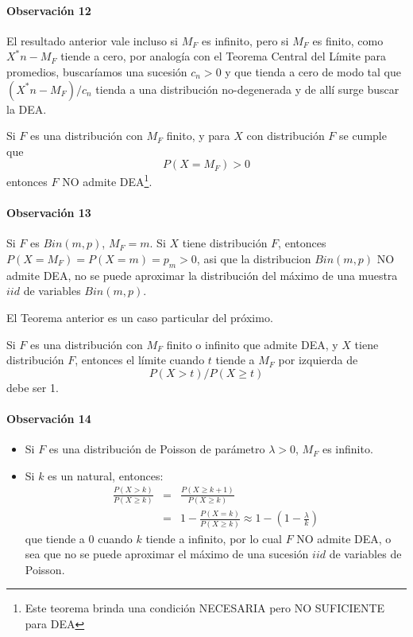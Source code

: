 \documentclass[
  12pt]{article}
\begin{document}
\paragraph*{Observación 12}

El resultado anterior vale incluso si \(M_F\) es infinito, pero si
\(M_F\) es finito, como \(X^*n - M_F\) tiende a cero, por analogía con
el Teorema Central del Límite para promedios, buscaríamos una sucesión
\(c_n>0\) y que tienda a cero de modo tal que \((X^*n- M_F )/ c_n\)
tienda a una distribución no-degenerada y de allí surge buscar la DEA.

\begin{theorem}
Si $F$ es una distribución con $M_F$ finito, y para $X$ con distribución $F$ se cumple que
$$
P(X=M_F)>0 
$$
entonces $F$ NO admite DEA\footnote{Este teorema brinda una condición NECESARIA pero NO SUFICIENTE para DEA}.
\end{theorem}

\paragraph*{Observación 13}

Si \(F\) es \(Bin(m,p)\), \(M_F=m\). Si \(X\) tiene distribución \(F\),
entonces \(P( X=M_F)= P( X=m)= p_m>0\), asi que la distribucion
\(Bin(m,p)\) NO admite DEA, no se puede aproximar la distribución del
máximo de una muestra \(iid\) de variables \(Bin(m,p)\).

El Teorema anterior es un caso particular del próximo.

\begin{theorem}
Si $F$ es una distribución con $M_F$ finito o infinito que admite DEA, y $X$ tiene distribución $F$, entonces el límite cuando $t$ tiende a $M_F$ por izquierda de
$$P(X>t)/P(X \geq t)$$
debe ser 1.
\end{theorem}

\paragraph*{Observación 14}
\begin{itemize}
\item Si $F$ es una distribución de Poisson de parámetro $\lambda>0$, $M_F$ es infinito. 
\item Si $k$ es un natural, entonces:
\begin{eqnarray}
\frac{P(X>k)}{P(X\geq k)} &=& \frac{P(X \geq k+1)}{P(X\geq k)} \\ \nonumber
&=& 1-\frac{P(X=k)}{P(X \geq k)} \approx 1-\left(1- \frac{\lambda}{k}\right) 
\end{eqnarray}
que tiende a $0$ cuando $k$ tiende a infinito, por lo cual $F$ NO admite DEA, o sea que no se puede aproximar el máximo de una sucesión $iid$ de variables de Poisson.
\end{itemize}
\end{document}
